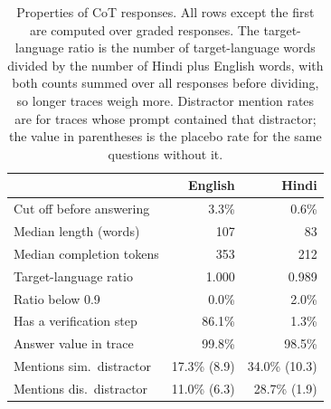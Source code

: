 \begin{table}[t]
\centering
\small
\setlength{\tabcolsep}{4pt}
\begin{tabular}{lrr}
\toprule
 & English & Hindi \\
\midrule
Cut off before answering & 3.3\% & 0.6\% \\
Median length (words) & 107 & 83 \\
Median completion tokens & 353 & 212 \\
Target-language ratio & 1.000 & 0.989 \\
Ratio below 0.9 & 0.0\% & 2.0\% \\
Has a verification step & 86.1\% & 1.3\% \\
Answer value in trace & 99.8\% & 98.5\% \\
Mentions sim.\ distractor & 17.3\% (8.9) & 34.0\% (10.3) \\
Mentions dis.\ distractor & 11.0\% (6.3) & 28.7\% (1.9) \\
\bottomrule
\end{tabular}
\caption{Properties of CoT responses. All rows except the first are computed over graded responses. The target-language ratio is the number of target-language words divided by the number of Hindi plus English words, with both counts summed over all responses before dividing, so longer traces weigh more. Distractor mention rates are for traces whose prompt contained that distractor; the value in parentheses is the placebo rate for the same questions without it.}
\label{tab:trace}
\end{table}
